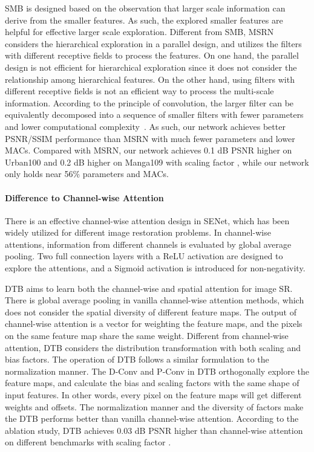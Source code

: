 \documentclass[manuscript,screen]{acmart}
\begin{document}
SMB is designed based on the observation that larger scale information can derive from the smaller features. As such, the explored smaller features are helpful for effective larger scale exploration. Different from SMB, MSRN considers the hierarchical exploration in a parallel design, and utilizes the filters with different receptive fields to process the features. On one hand, the parallel design is not efficient for hierarchical exploration since it does not consider the relationship among hierarchical features. On the other hand, using filters with different receptive fields is not an efficient way to process the multi-scale information. According to the principle of convolution, the larger filter can be equivalently decomposed into a sequence of smaller filters with fewer parameters and lower computational complexity~\cite{inception_cvpr2015}. As such, our network achieves better PSNR/SSIM performance than MSRN with much fewer parameters and lower MACs. Compared with MSRN, our network achieves 0.1 dB PSNR higher on Urban100 and 0.2 dB higher on Manga109 with scaling factor , while our network only holds near 56\% parameters and MACs.


\paragraph{Difference to Channel-wise Attention~\cite{senet_pami2020}}
There is an effective channel-wise attention design in SENet, which has been widely utilized for different image restoration problems. In channel-wise attentions, information from different channels is evaluated by global average pooling. Two full connection layers with a ReLU activation are designed to explore the attentions, and a Sigmoid activation is introduced for non-negativity.


DTB aims to learn both the channel-wise and spatial attention for image SR. There is global average pooling in vanilla channel-wise attention methods, which does not consider the spatial diversity of different feature maps. The output of channel-wise attention is a vector for weighting the feature maps, and the pixels on the same feature map share the same weight. Different from channel-wise attention, DTB considers the distribution transformation with both scaling and bias factors. The operation of DTB follows a similar formulation to the normalization manner. The D-Conv and P-Conv in DTB orthogonally explore the feature maps, and calculate the bias and scaling factors with the same shape of input features. In other words, every pixel on the feature maps will get different weights and offsets. The normalization manner and the diversity of factors make the DTB performs better than vanilla channel-wise attention. According to the ablation study, DTB achieves 0.03 dB PSNR higher than channel-wise attention on different benchmarks with scaling factor .
\end{document}

